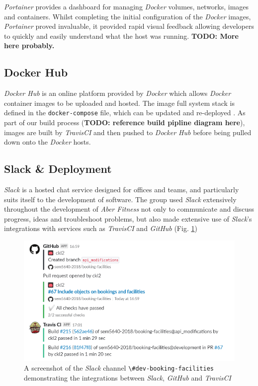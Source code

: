 \par
\textit{Portainer} provides a dashboard for managing \textit{Docker} volumes, networks, images and containers. Whilst completing the initial configuration of the \textit{Docker} images, \textit{Portainer} proved invaluable, it provided rapid visual feedback allowing developers to quickly and easily understand what the host was running. \textbf{TODO: More here probably.}

\subsection{Docker Hub}
\par
\textit{Docker Hub} is an online platform provided by \textit{Docker} which allows \textit{Docker} container images to be uploaded and hosted. The image full system stack is defined in the \lstinline{docker-compose} file, which can be updated and re-deployed . As part of our build process (\textbf{TODO: reference build pipline diagram here}), images are built by \textit{TravisCI} and then pushed to \textit{Docker Hub} before being pulled down onto the \textit{Docker} hosts.


\subsection{Slack \& Deployment}
\par
\textit{Slack} is a hosted chat service designed for offices and teams, and particularly suits itself to the development of software. The group used \textit{Slack} extensively throughout the development of \textit{Aber Fitness} not only to communicate and discuss progress, ideas and troubleshoot problems, but also made extensive use of \textit{Slack}'s integrations with services such as \textit{TravisCI} and \textit{GitHub} (Fig. \ref{fig:slack_travis_github})

\begin{figure}[H]
    \centering
    \includegraphics[width=\textwidth]{Images/Slack_Travis_GitHub.png}
    \caption{A screenshot of the \textit{Slack} channel \lstinline{\#dev-booking-facilities} demonstrating the integrations between \textit{Slack}, \textit{GitHub} and \textit{TravisCI}}
    \label{fig:slack_travis_github}
\end{figure}

